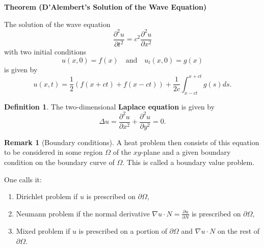 \documentclass[12pt,openany]{book}
\theoremstyle{definition}
\newtheorem{definition}{Definition}[chapter]
\newtheorem{remark}{Remark}[chapter]
\begin{document}
	\textbf{Theorem (D'Alembert's Solution of the Wave Equation)}
	
	The solution of the wave equation
	\[
	\frac{\partial^2 u}{\partial t^2} = c^2 \frac{\partial^2 u}{\partial x^2}
	\]
	with two initial conditions
	\[
	u(x, 0) = f(x) \quad \text{and} \quad u_t(x, 0) = g(x)
	\]
	is given by
	\[
	u(x, t) = \frac{1}{2} (f(x + ct) + f(x - ct)) + \frac{1}{2c} \int_{x-ct}^{x+ct} g(s) ds.
	\]
	\newpage
	
	\begin{tcolorbox}[colframe=defcolor, title={\color{white}\bf Laplace Equation}]
		\begin{definition}
			The two-dimensional \textbf{Laplace equation} is given by
			\[
			\Delta u = \frac{\partial^2 u}{\partial x^2} + \frac{\partial^2 u}{\partial y^2} = 0.
			\]
		\end{definition}
	\end{tcolorbox}
	\begin{remark}[Boundary conditions]
		A heat problem then consists of this equation to be considered in some region \( \Omega \) of the \( xy \)-plane and a given boundary condition on the boundary curve of \( \Omega \). This is called a boundary value problem.
		\begin{figure}[h!]\centering
		\end{figure} 
		
		One calls it:
		\begin{enumerate}
			\item Dirichlet problem if \( u \) is prescribed on \( \partial\Omega \),
			\item Neumann problem if the normal derivative \( \nabla u \cdot N = \frac{\partial u}{\partial N} \) is prescribed on \( \partial\Omega \),
			\item Mixed problem if \( u \) is prescribed on a portion of \( \partial\Omega \) and \( \nabla u \cdot N \) on the rest of \( \partial\Omega \).
		\end{enumerate}
	\end{remark}
	
\end{document}
